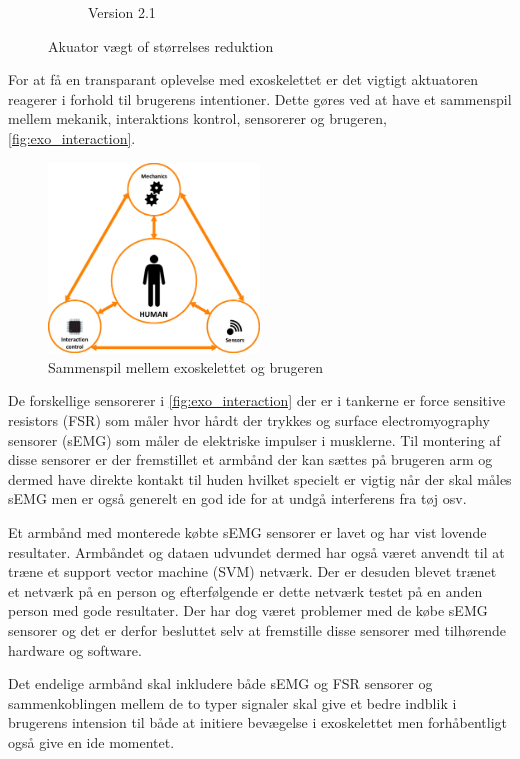 \begin{figure}[htbp]
\begin{subfigure}[b]{0.3\textwidth}
 		\caption{Version 2.1}
 		\label{fig:smaller_aktuator}
     \end{subfigure}
     \caption{Akuator vægt of størrelses reduktion}
\end{figure}

For at få en transparant oplevelse med exoskelettet er det vigtigt aktuatoren reagerer i forhold til brugerens intentioner. Dette gøres ved at have et sammenspil mellem mekanik, interaktions kontrol, sensorerer og brugeren, \autoref{fig:exo_interaction}.  

\begin{figure}[htbp]
	\centering
	\includegraphics[width=0.5\textwidth]{figures/human_interaction}
	\caption{Sammenspil mellem exoskelettet og brugeren}
	\label{fig:exo_interaction}
\end{figure}

De forskellige sensorerer i \autoref{fig:exo_interaction} der er i tankerne er force sensitive resistors (FSR) som måler hvor hårdt der trykkes og surface electromyography sensorer (sEMG) som måler de elektriske impulser i musklerne. Til montering af disse sensorer er der fremstillet et armbånd der kan sættes på brugeren arm og dermed have direkte kontakt til huden hvilket specielt er vigtig når der skal måles sEMG men er også generelt en god ide for at undgå interferens fra tøj osv.

Et armbånd med monterede købte sEMG sensorer er lavet og har vist lovende resultater. Armbåndet og dataen udvundet dermed har også været anvendt til at træne et support vector machine (SVM) netværk. Der er desuden blevet trænet et netværk på en person og efterfølgende er dette netværk testet på en anden person med gode resultater. Der har dog været problemer med de købe sEMG sensorer og det er derfor besluttet selv at fremstille disse sensorer med tilhørende hardware og software. 

Det endelige armbånd skal inkludere både sEMG og FSR sensorer og sammenkoblingen mellem de to typer signaler skal give et bedre indblik i brugerens intension til både at initiere bevægelse i exoskelettet men forhåbentligt også give en ide momentet.

